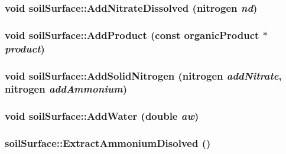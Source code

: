 \hypertarget{classsoil_surface_a61a48f2de12c8e87039fdba220856439}{
\subsubsection[{AddNitrateDissolved}]{\setlength{\rightskip}{0pt plus 5cm}void soilSurface::AddNitrateDissolved ({\bf nitrogen} {\em nd})}}
\label{classsoil_surface_a61a48f2de12c8e87039fdba220856439}
\hypertarget{classsoil_surface_af3935f9b1363a0eee0f46a5c26b7f115}{
\subsubsection[{AddProduct}]{\setlength{\rightskip}{0pt plus 5cm}void soilSurface::AddProduct (const {\bf organicProduct} $\ast$ {\em product})}}
\label{classsoil_surface_af3935f9b1363a0eee0f46a5c26b7f115}
\hypertarget{classsoil_surface_afef3d7ce9b27c8f12412031604133e9a}{
\subsubsection[{AddSolidNitrogen}]{\setlength{\rightskip}{0pt plus 5cm}void soilSurface::AddSolidNitrogen ({\bf nitrogen} {\em addNitrate}, \/  {\bf nitrogen} {\em addAmmonium})}}
\label{classsoil_surface_afef3d7ce9b27c8f12412031604133e9a}
\hypertarget{classsoil_surface_a5d6f8c4c397d6cf8269ddd588e3e37f8}{
\subsubsection[{AddWater}]{\setlength{\rightskip}{0pt plus 5cm}void soilSurface::AddWater (double {\em aw})}}
\label{classsoil_surface_a5d6f8c4c397d6cf8269ddd588e3e37f8}
\hypertarget{classsoil_surface_a8142c8ab4d304c03b412bc1c28c8a40b}{
\subsubsection[{ExtractAmmoniumDisolved}]{ soilSurface::ExtractAmmoniumDisolved ()}}

